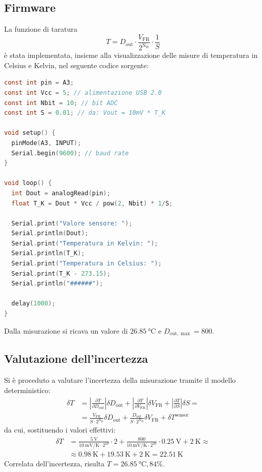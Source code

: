 \documentclass{article}
\begin{document}
\subsection{Firmware}
La funzione di taratura
\begin{equation*}
    T=D_{\text{out}}\cdot\frac{V_{\text{FR}}}{2^{\text{N}_\text{B}}}\cdot\frac{1}{S}
\end{equation*}
è stata implementata, insieme alla visualizzazione delle misure di temperatura in Celsius e Kelvin, nel seguente codice sorgente:
\begin{lstlisting}[language=C]
const int pin = A3;
const int Vcc = 5; // alimentazione USB 2.0
const int Nbit = 10; // bit ADC
const int S = 0.01; // da: Vout = 10mV * T_K

void setup() {
  pinMode(A3, INPUT);
  Serial.begin(9600); // baud rate
}

void loop() {
  int Dout = analogRead(pin); 
  float T_K = Dout * Vcc / pow(2, Nbit) * 1/S; 

  Serial.print("Valore sensore: ");
  Serial.println(Dout);
  Serial.print("Temperatura in Kelvin: ");
  Serial.println(T_K);
  Serial.print("Temperatura in Celsius: ");
  Serial.print(T_K - 273.15);
  Serial.println("######");

  delay(1000);
}
\end{lstlisting}
Dalla misurazione si ricava un valore di $\SI{26.85}{\celsius}$ e $D_{\text{out}, \max}=800$.
\subsection{Valutazione dell'incertezza}
Si è proceduto a valutare l'incertezza della misurazione tramite il modello deterministico:
\begin{equation*}
    \begin{split}
        \delta T&=\left|\frac{\partial T}{\partial D_{\text{out}}}\right|\delta D_{\text{out}}+\left|\frac{\partial T}{\partial V_{\text{FR}}}\right|\delta V_{\text{FR}}+\left|\frac{\partial T}{\partial S}\right|\delta S=\\
        &=\frac{V_{\text{FR}}}{S\cdot2^{\text{N}_\text{B}}}\delta D_{\text{out}}+\frac{D_{\text{out}}}{S\cdot2^{\text{N}_\text{B}}}\delta V_{\text{FR}}+\delta T^{\text{sensor}}
    \end{split}
\end{equation*}
da cui, sostituendo i valori effettivi:
\begin{equation*}
    \begin{split}    
        \delta T&=\frac{\SI{5}\volt}{\SI{10}{\milli\volt\per\kelvin}\cdot2^{10}}\cdot 2+\frac{800}{\SI{10}{\milli\volt\per\kelvin}\cdot 2^{10}}\cdot\SI{0.25}{\volt}+\SI{2}{\kelvin}\approx\\&\approx \SI{0.98}{\kelvin}+\SI{19.53}{\kelvin}+\SI{2}{\kelvin}=\SI{22.51}{\kelvin}
    \end{split}    
\end{equation*}
Correlata dell'incertezza, risulta $T = \SI{26.85}{\celsius}, 84\%$.
\end{document}
